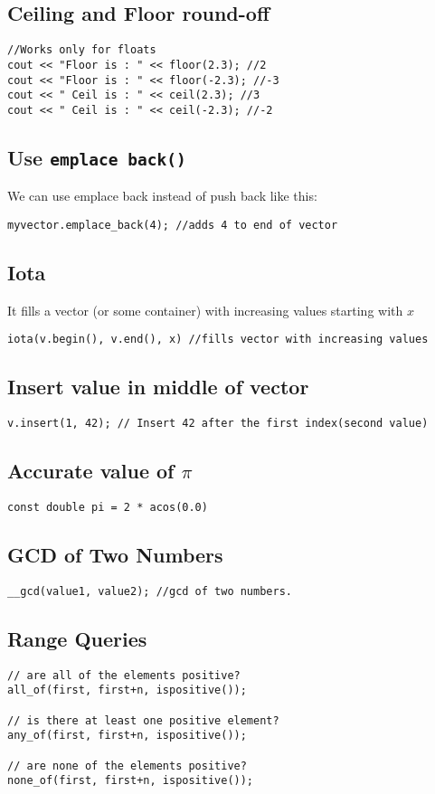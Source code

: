 \documentclass[twoside,12pt,a4paper,english]{book}
\theoremstyle{definition}
\theoremstyle{problemstyle}
\theoremstyle{problemstyle}
\theoremstyle{problemstyle}
\begin{document}
\subsection{Ceiling and Floor round-off}
\begin{lstlisting}
//Works only for floats
cout << "Floor is : " << floor(2.3); //2
cout << "Floor is : " << floor(-2.3); //-3
cout << " Ceil is : " << ceil(2.3); //3
cout << " Ceil is : " << ceil(-2.3); //-2
\end{lstlisting}
\subsection{Use \texttt{emplace back()}}
We can use emplace back instead of push back like this:
\begin{lstlisting}
myvector.emplace_back(4); //adds 4 to end of vector
\end{lstlisting}
\subsection{Iota}
It fills a vector (or some container) with increasing values starting with $x$
\begin{lstlisting}
iota(v.begin(), v.end(), x) //fills vector with increasing values
\end{lstlisting}
\subsection{Insert value in middle of vector}
\begin{lstlisting}
v.insert(1, 42); // Insert 42 after the first index(second value)
\end{lstlisting}
\subsection{Accurate value of \texorpdfstring{$\pi$}{Pi}}
\begin{lstlisting}
const double pi = 2 * acos(0.0)
\end{lstlisting}
\subsection{GCD of Two Numbers}
\begin{lstlisting}
__gcd(value1, value2); //gcd of two numbers.
\end{lstlisting}
\subsection{Range Queries}
\begin{lstlisting}
// are all of the elements positive?
all_of(first, first+n, ispositive());

// is there at least one positive element?
any_of(first, first+n, ispositive());

// are none of the elements positive?
none_of(first, first+n, ispositive());
\end{lstlisting}
\newpage
\end{document}
